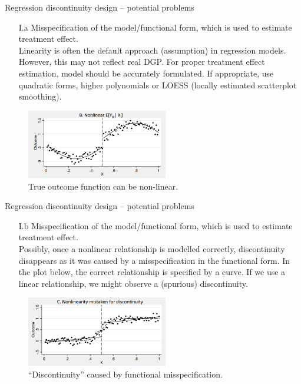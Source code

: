 \documentclass{beamer}
\begin{document}
\begin{frame}{Regression discontinuity design -- potential problems}
\begin{itemize}
    \item[I.a] Misspecification of the model/functional form, which is used to estimate treatment effect.\\
    \bigskip
    Linearity is often the default approach (assumption) in regression models. However, this may not reflect real DGP. For proper treatment effect estimation, model should be accurately formulated. If appropriate, use quadratic forms, higher polynomials or LOESS (locally estimated scatterplot smoothing).
\end{itemize}
\begin{figure}
    \centering
    \includegraphics[width=0.55\textwidth]{./IMG/RDD2.png} 
    \caption*{True outcome function can be non-linear.} \label{fig:my_label1}
\end{figure}    
\end{frame}
\begin{frame}{Regression discontinuity design -- potential problems}
\begin{itemize}
    \item[I.b] Misspecification of the model/functional form, which is used to estimate treatment effect.\\ 
    \bigskip
    Possibly, once a nonlinear relationship is modelled correctly, discontinuity disappears as it was caused by a misspecification in the functional form. In the plot below, the correct relationship is specified by a curve. If we use a linear relationship, we might observe a (spurious) discontinuity.
\end{itemize}
\begin{figure}
    \centering
    \includegraphics[width=0.55\textwidth]{./IMG/RDD3.png}
    \caption*{``Discontinuity'' caused by functional misspecification.} \label{fig:my_label2}
\end{figure}    
\end{frame}
\end{document}
